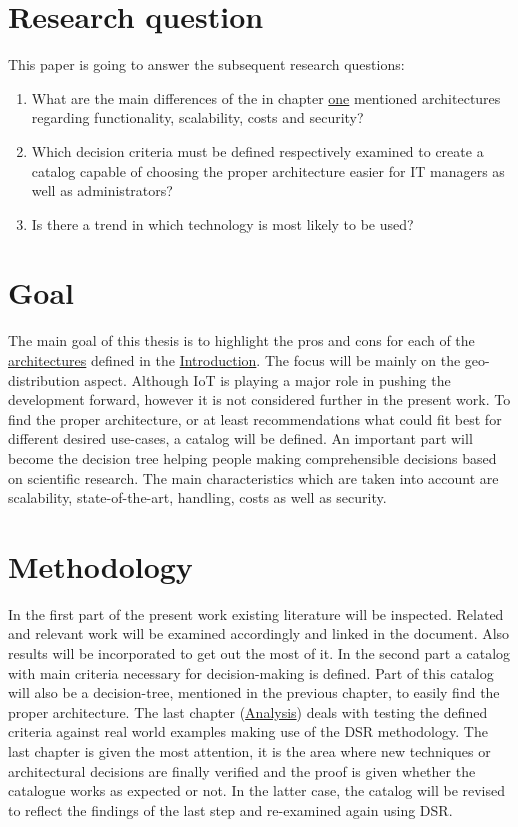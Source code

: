 \documentclass[MSC,Master,english]{twbook}%
\begin{document}
\section{Research question}
\label{sec:rq}
This paper is going to answer the subsequent research questions:
\begin{enumerate}
    \item What are the main differences of the in chapter \hyperref[item:architecture]{one} mentioned architectures regarding functionality, scalability, costs and security?
    \item Which decision criteria must be defined respectively examined to create a catalog capable
    of choosing the proper architecture easier for \ac{IT} managers as well as administrators?
    \item Is there a trend in which technology is most likely to be used?
\end{enumerate}

\section{Goal}
\label{sec:goal}
The main goal of this thesis is to highlight the pros and cons for each of the \hyperref[item:architecture]{architectures} defined in the \hyperref[chap:introduction]{Introduction}. The focus will be mainly on the geo-distribution aspect. Although \ac{IoT} is playing a major role in pushing the development forward, however it is not considered further in the present work. To find the proper architecture, or at least recommendations what could fit best for different desired use-cases, a catalog will be defined. An important part will become the decision tree helping people making comprehensible decisions based on scientific research. The main characteristics which are taken into account are scalability, state-of-the-art, handling, costs as well as security.

\section{Methodology}
\label{sec:methodology}
In the first part of the present work existing literature will be inspected. Related and relevant work will be examined accordingly and linked in the document. Also results will be incorporated to get out the most of it. In the second part a catalog with main criteria necessary for decision-making is defined. Part of this catalog will also be a decision-tree, mentioned in the previous chapter, to easily find the proper architecture. The last chapter (\hyperref[sec:dsranalysis]{Analysis}) deals with testing the defined criteria against real world examples making use of the \ac{DSR} methodology. The last chapter is given the most attention, it is the area where new techniques or architectural decisions are finally verified and the proof is given whether the catalogue works as expected or not. In the latter case, the catalog will be revised to reflect the findings of the last step and re-examined again using \ac{DSR}.
\end{document}
